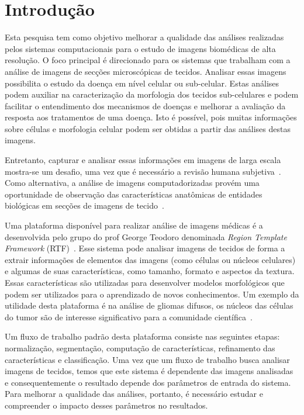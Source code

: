 \documentclass[a4paper,10pt]{article}
\begin{document}
	
	
\section{Introdução}\label{introducao}


Esta pesquisa tem como objetivo melhorar a qualidade das análises realizadas pelos sistemas computacionais para o estudo de imagens biomédicas de alta resolução. O foco principal é direcionado para os sistemas que trabalham com a análise de imagens de secções microscópicas de tecidos. Analisar essas imagens possibilita o estudo da doença em nível celular ou sub-celular. Estas análises podem auxiliar na caracterização da morfologia dos tecidos sub-celulares e podem facilitar o entendimento dos mecanismos de doenças e melhorar a avaliação da resposta aos tratamentos de uma doença. Isto é possível, pois muitas informações sobre células e morfologia celular podem ser obtidas a partir das análises destas imagens.

Entretanto, capturar e analisar essas informações em imagens de larga escala mostra-se um desafio, uma vez que é necessário a revisão humana subjetiva~\cite{kong2011comprehensive}. Como alternativa, a análise de imagens computadorizadas provém uma oportunidade de observação das características anatômicas de entidades biológicas em secções de imagens de tecido~\cite{kong2010texture}.

Uma plataforma disponível para realizar análise de imagens médicas é a desenvolvida pelo grupo do prof George Teodoro denominada \textit{Region Template Framework} (RTF)~\cite{teodoro2014region}. Esse sistema pode analisar imagens de tecidos de forma a extrair informações de elementos das imagens (como células ou núcleos celulares) e algumas de suas características, como tamanho, formato e aspectos da textura. Essas características são utilizadas para desenvolver modelos morfológicos que podem ser utilizados para o aprendizado de novos conhecimentos. Um exemplo da utilidade desta plataforma é na análise de gliomas difusos, os núcleos das células do tumor são de interesse significativo para a comunidade científica~\cite{gupta2005clarifying}.

Um fluxo de trabalho padrão desta plataforma consiste nas seguintes etapas: normalização, segmentação, computação de características, refinamento das características e classificação. Uma vez que um fluxo de trabalho busca analisar imagens de tecidos, temos que este sistema é dependente das imagens analisadas e consequentemente o resultado depende dos parâmetros de entrada do sistema. Para melhorar a qualidade das análises, portanto, é necessário estudar e compreender o impacto desses parâmetros no resultados. 
\end{document}
